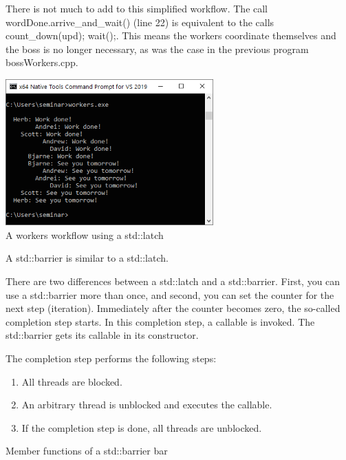 There is not much to add to this simplified workflow. The call wordDone.arrive\_and\_wait() (line 22) is equivalent to the calls count\_down(upd); wait();. This means the workers coordinate themselves and the boss is no longer necessary, as was the case in the previous program bossWorkers.cpp.

\begin{center}
\includegraphics[width=0.6\textwidth]{content/3/chapter6/images/20.png}\\
A workers workflow using a std::latch
\end{center}

A std::barrier is similar to a std::latch.


There are two differences between a std::latch and a std::barrier. First, you can use a std::barrier more than once, and second, you can set the counter for the next step (iteration). Immediately after the counter becomes zero, the so-called completion step starts. In this completion step, a callable is invoked. The std::barrier gets its callable in its constructor.

The completion step performs the following steps:

\begin{enumerate}
\item 
All threads are blocked.

\item 
An arbitrary thread is unblocked and executes the callable.

\item 
If the completion step is done, all threads are unblocked.
\end{enumerate}

\begin{center}
Member functions of a std::barrier bar
\end{center}

